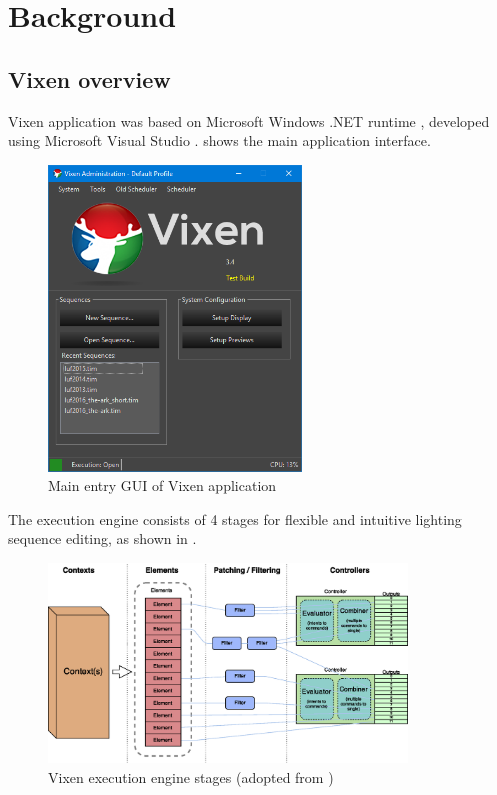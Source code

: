 \chapter{Background}
\renewcommand{\baselinestretch}{\mystretch}
\label{chap:BG}

\section{Vixen overview}

 Vixen application was based on Microsoft Windows .NET runtime \cite{dotnet}, developed using Microsoft Visual Studio \cite{msvs}.  shows the main application interface.

\begin{figure}[!t]
  \centering
  \includegraphics[width=0.6\textwidth]{Figs//vixen_main.png}
  \caption{\footnotesize Main entry GUI of Vixen application}
  \label{fig:vixen-main}
\end{figure}

The execution engine consists of 4 stages for flexible and intuitive lighting sequence editing, as shown in .

\begin{figure}[!t]
  \centering
  \includegraphics[width=0.85\textwidth]{Figs//V3-Engine-1.eps}
  \caption{\footnotesize Vixen execution engine stages (adopted from \cite{vixen})}
  \label{fig:stages}
\end{figure}

